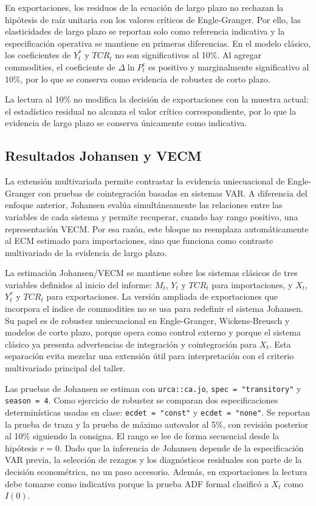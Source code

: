 \documentclass[11pt,a4paper]{article}
\begin{document}
	En exportaciones, los residuos de la ecuación de largo plazo no rechazan la
	hipótesis de raíz unitaria con los valores críticos de Engle-Granger. Por ello,
	las elasticidades de largo plazo se reportan solo como referencia indicativa y
	la especificación operativa se mantiene en primeras diferencias. En el modelo
	clásico, los coeficientes de \(Y_t^*\) y \(TCR_t\) no son significativos al
	10\%. Al agregar commodities, el coeficiente de \(\Delta \ln P_t^c\) es
	positivo y marginalmente significativo al 10\%, por lo que se conserva como
	evidencia de robustez de corto plazo.
	
	La lectura al 10\% no modifica la decisión de exportaciones con la muestra
	actual: el estadístico residual no alcanza el valor crítico correspondiente, por
	lo que la evidencia de largo plazo se conserva únicamente como indicativa.
	
	\subsection{Resultados Johansen y VECM}
	\label{subsec:resultados-johansen-vec}
	
	La extensión multivariada permite contrastar la evidencia uniecuacional de
	Engle-Granger con pruebas de cointegración basadas en sistemas VAR. A diferencia
	del enfoque anterior, Johansen evalúa simultáneamente las relaciones entre las
	variables de cada sistema y permite recuperar, cuando hay rango positivo, una
	representación VECM. Por esa razón, este bloque no reemplaza automáticamente al
	ECM estimado para importaciones, sino que funciona como contraste multivariado
	de la evidencia de largo plazo.

	La estimación Johansen/VECM se mantiene sobre los sistemas clásicos de tres
	variables definidos al inicio del informe: \(M_t\), \(Y_t\) y \(TCR_t\) para
	importaciones, y \(X_t\), \(Y_t^*\) y \(TCR_t\) para exportaciones. La versión
	ampliada de exportaciones que incorpora el índice de commodities no se usa para
	redefinir el sistema Johansen. Su papel es de robustez uniecuacional en
	Engle-Granger, Wickens-Breusch y modelos de corto plazo, porque opera como
	control externo y porque el sistema clásico ya presenta advertencias de
	integración y cointegración para \(X_t\). Esta separación evita mezclar una
	extensión útil para interpretación con el criterio multivariado principal del
	taller.
	
	Las pruebas de Johansen se estiman con \texttt{urca::ca.jo},
	\texttt{spec = "transitory"} y \texttt{season = 4}. Como ejercicio de robustez
	se comparan dos especificaciones determinísticas usadas en clase:
	\texttt{ecdet = "const"} y \texttt{ecdet = "none"}. Se reportan la prueba de
	traza y la prueba de máximo autovalor al 5\%, con revisión posterior al 10\%
	siguiendo la consigna. El rango se lee de forma secuencial desde la hipótesis
	\(r=0\). Dado que la inferencia de Johansen depende de la especificación VAR
	previa, la selección de rezagos y los diagnósticos residuales son parte de la
	decisión econométrica, no un paso accesorio. Además, en exportaciones la lectura
	debe tomarse como indicativa porque la prueba ADF formal clasificó a \(X_t\)
	como \(I(0)\).
	
\end{document}
